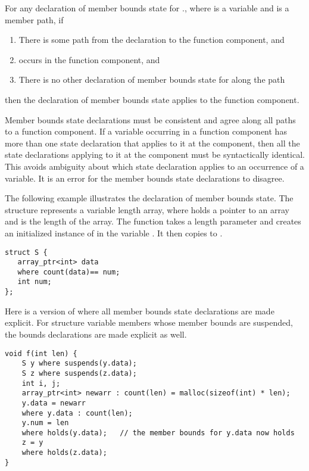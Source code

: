 For any declaration of member bounds state for ., where
 is a variable and  is a member path, if
\begin{enumerate}
\item
  There is some path from the declaration to the function component, and
\item
   occurs in the function component, and
\item
  There is no other declaration of member bounds state for 
  along the path
\end{enumerate}
then the declaration of member bounds state applies to the function
component.

Member bounds state declarations must be consistent and agree
along all paths to a function component.   If a variable occurring in a
function component has more than one state declaration that applies to
it at the component, then all the state declarations applying to it at
the component must be syntactically identical. This avoids ambiguity
about which state declaration applies to an occurrence of a variable.
It is an error for the member bounds state declarations to disagree.

The following example illustrates the declaration of member bounds
state. The structure  represents a variable length array,
where  holds a pointer to an array and  is the 
length of the array. The function  takes a length parameter  
 and creates an initialized instance of  in the 
variable .  It then copies  to .

\begin{lstlisting}
struct S {
   array_ptr<int> data
   where count(data)== num;
   int num;
};
\end{lstlisting}

Here is a version of  where all member bounds state declarations are
made explicit. For structure variable members whose member bounds are
suspended, the bounds declarations are made explicit as well.

\begin{lstlisting}
void f(int len) {
    S y where suspends(y.data);
    S z where suspends(z.data);
    int i, j;
    array_ptr<int> newarr : count(len) = malloc(sizeof(int) * len);
    y.data = newarr
    where y.data : count(len);
    y.num = len
    where holds(y.data);   // the member bounds for y.data now holds
    z = y
    where holds(z.data);
}
\end{lstlisting}

